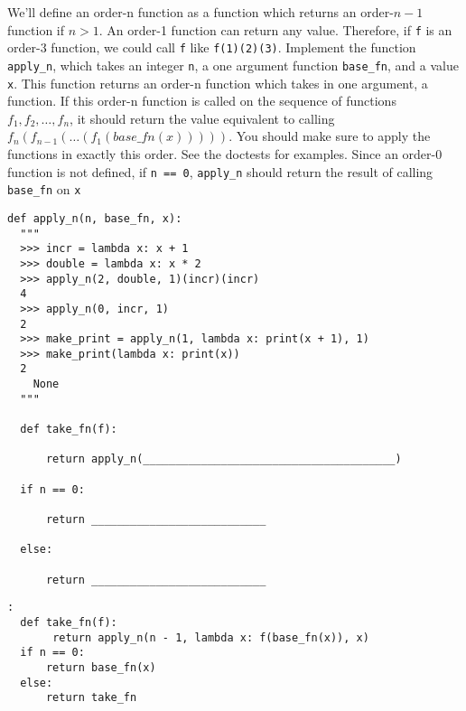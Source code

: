 \begin{blocksection}
\question 
We'll define an order-n function as a function which returns an order-$n-1$ function if $n > 1$. An order-1 function can return any value. 
\newline
\newline
Therefore, if \texttt{f} is an order-3 function, we could call \texttt{f} like \lstinline{f(1)(2)(3)}. 
\newline
\newline
Implement the function \texttt{apply\_n}, which takes an integer \texttt{n}, a one argument function \texttt{base\_fn},
and a value \texttt{x}. This function returns an order-n function which takes in one argument, a function. If this order-n function is called on the sequence of functions $f_1, f_2, \ldots, f_n$, it should return the value equivalent to calling
$f_n(f_{n - 1}(\ldots (f_1(base\_fn(x)))))$. You should make sure to apply the functions in exactly this order. See the doctests for examples.
\newline 
\newline
Since an order-0 function is not defined, if \texttt{n == 0}, \texttt{apply\_n} should return the result of calling
\texttt{base\_fn} on \texttt{x}
\newline
\begin{lstlisting}
def apply_n(n, base_fn, x): 
  """ 
  >>> incr = lambda x: x + 1
  >>> double = lambda x: x * 2
  >>> apply_n(2, double, 1)(incr)(incr) 
  4
  >>> apply_n(0, incr, 1)
  2
  >>> make_print = apply_n(1, lambda x: print(x + 1), 1)
  >>> make_print(lambda x: print(x))
  2
	None
  """
	
  def take_fn(f):
	    
      return apply_n(_______________________________________)
			
  if n == 0:
	
      return ___________________________
			
  else:
	
      return ___________________________		
\end{lstlisting}
\end{blocksection}
\begin{blocksection}

\begin{solution}[0in]
\begin{lstlisting}:
  def take_fn(f):
       return apply_n(n - 1, lambda x: f(base_fn(x)), x)
  if n == 0:
      return base_fn(x)
  else:
      return take_fn
\end{lstlisting}
\end{solution}
\end{blocksection}
